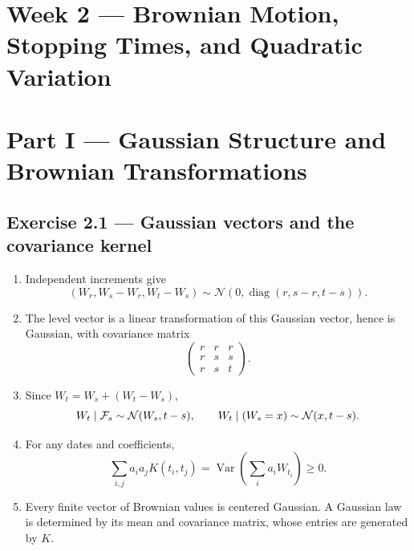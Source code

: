 
\section{Week 2 --- Brownian Motion, Stopping Times, and Quadratic Variation}

\section*{Part I --- Gaussian Structure and Brownian Transformations}

\subsection*{Exercise 2.1 --- Gaussian vectors and the covariance kernel}
\begin{enumerate}
  \item Independent increments give
  \[
  (W_r,W_s-W_r,W_t-W_s)
  \sim\mathcal N\!\left(
  0,\operatorname{diag}(r,s-r,t-s)
  \right).
  \]
  \item The level vector is a linear transformation of this Gaussian vector,
  hence is Gaussian, with covariance matrix
  \[
  \begin{pmatrix}
  r&r&r\\
  r&s&s\\
  r&s&t
  \end{pmatrix}.
  \]
  \item Since \(W_t=W_s+(W_t-W_s)\),
  \[
  W_t\mid\mathcal{F}_s\sim\mathcal N(W_s,t-s),
  \qquad
  W_t\mid(W_s=x)\sim\mathcal N(x,t-s).
  \]
  \item For any dates and coefficients,
  \[
  \sum_{i,j}a_ia_jK(t_i,t_j)
  =\operatorname{Var}\!\left(\sum_i a_iW_{t_i}\right)\geq0.
  \]
  \item Every finite vector of Brownian values is centered Gaussian. A
  Gaussian law is determined by its mean and covariance matrix, whose entries
  are generated by \(K\).
\end{enumerate}

